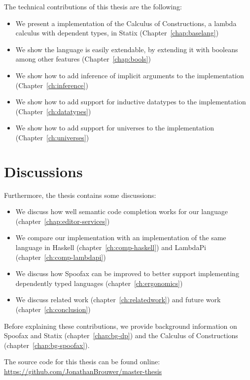 The technical contributions of this thesis are the following:
\begin{itemize}
	\item We present a implementation of the Calculus of Constructions, a lambda calculus with dependent types, in Statix (Chapter~\ref{chap:baselang})
	\item We show the language is easily extendable, by extending it with booleans among other features (Chapter~\ref{chap:bools})
	\item We show how to add inference of implicit arguments to the implementation (Chapter~\ref{ch:inference})
	\item We show how to add support for inductive datatypes to the implementation (Chapter~\ref{ch:datatypes})
	\item We show how to add support for universes to the implementation (Chapter~\ref{ch:universes})
\end{itemize}

\section*{Discussions}

Furthermore, the thesis contains some discussions:
\begin{itemize}
	\item We discuss how well semantic code completion works for our language (chapter~\ref{chap:editor-services})
	\item We compare our implementation with an implementation of the same language in Haskell (chapter~\ref{ch:comp-haskell}) and LambdaPi (chapter~\ref{ch:comp-lambdapi})
	\item We discuss how Spoofax can be improved to better support implementing dependently typed languages (chapter~\ref{ch:ergonomics})
	\item We discuss related work (chapter~\ref{ch:relatedwork}) and future work (chapter~\ref{ch:conclusion})
\end{itemize}

\noindent Before explaining these contributions, we provide background information on Spoofax and Statix (chapter~\ref{chap:bg-dp}) and the Calculus of Constructions (chapter~\ref{chap:bg-spoofax}).

The source code for this thesis can be found online: \url{https://github.com/JonathanBrouwer/master-thesis}

